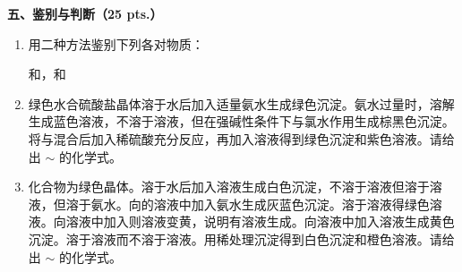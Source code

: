 \vspace{0.5cm}
\noindent\textbf{五、鉴别与判断（25 pts.）}

\begin{enumerate}[label=\arabic*., start=1, itemsep=1.5ex]
    \item 用二种方法鉴别下列各对物质：
    
    {\centering
    和，和 \par
    }
    \item 绿色水合硫酸盐晶体溶于水后加入适量氨水生成绿色沉淀。氨水过量时，溶解生成蓝色溶液，不溶于溶液，但在强碱性条件下与氯水作用生成棕黑色沉淀。将与混合后加入稀硫酸充分反应，再加入溶液得到绿色沉淀和紫色溶液。请给出 $\sim$ 的化学式。
    \item 化合物为绿色晶体。溶于水后加入溶液生成白色沉淀，不溶于溶液但溶于溶液，但溶于氨水。向的溶液中加入氨水生成灰蓝色沉淀。溶于溶液得绿色溶液。向溶液中加入则溶液变黄，说明有溶液生成。向溶液中加入溶液生成黄色沉淀。溶于溶液而不溶于溶液。用稀处理沉淀得到白色沉淀和橙色溶液。请给出 $\sim$ 的化学式。
\end{enumerate}